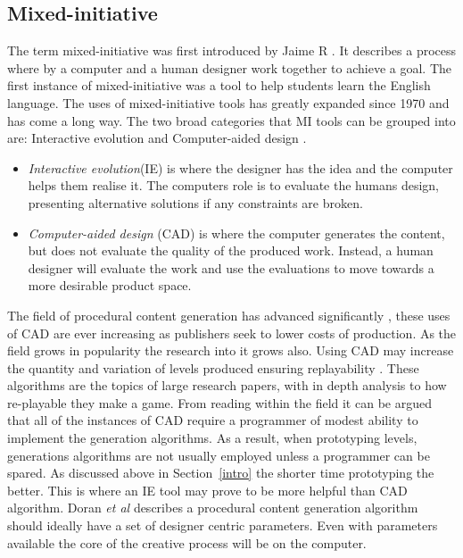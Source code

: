 \documentclass[journal]{IEEEtran}
\begin{document}
\subsection{Mixed-initiative} \label{MI}
The term mixed-initiative was first introduced by Jaime R \cite{carbonell1970mixed}.
It describes a process where by a computer and a human designer work together to achieve a goal. The first instance of mixed-initiative was a tool to help students learn the English language. The  uses of mixed-initiative tools has greatly expanded since 1970 and has come a long way.
The two broad categories that MI tools can be grouped into are: Interactive evolution and Computer-aided design \cite{liapis2016mixed}. 
\begin{itemize}
    \item \textit{Interactive evolution}(IE) is where the designer has the idea and the computer helps them realise it. The computers role is to evaluate the humans design, presenting alternative solutions if any constraints are broken. 
    
    \item \textit{Computer-aided design} (CAD) is where the computer generates the content, but does not evaluate the quality of the produced work. Instead, a human designer will evaluate the work and use the evaluations to move towards a more desirable product space.
\end{itemize}

The field of procedural content generation has advanced significantly \cite{van2013designing}, these uses of CAD are ever increasing as publishers seek to lower costs of production\cite{doherty2005mixed, font2016constrained}. As the field grows in popularity the research into it grows also. Using CAD may increase the quantity and variation of levels produced ensuring replayability \cite{karavolos2015mixed}. These algorithms are the topics of large research papers, with in depth analysis to how re-playable they make a game. From reading within the field it can be argued that all of the instances of CAD require a programmer of modest ability to implement the generation algorithms. As a result, when prototyping levels, generations algorithms are not usually employed unless a programmer can be spared. As discussed above in Section~\ref{intro} the shorter time prototyping the better. This is where an IE tool may prove to be more helpful than CAD algorithm. Doran \textit{et al} \cite{doran2010controlled} describes a procedural content generation algorithm should ideally have a set of designer centric parameters. Even with parameters available the core of the creative process will be on the computer. 
\end{document}
